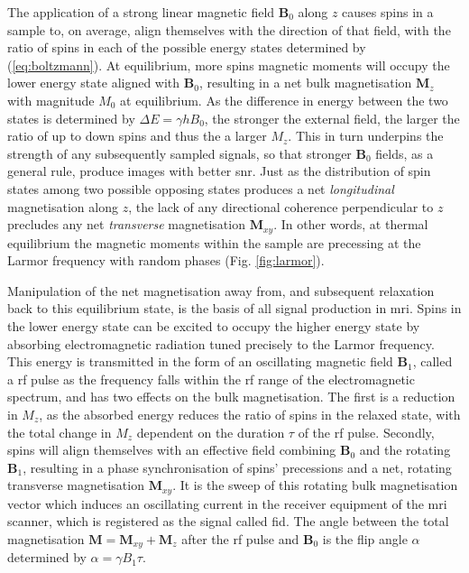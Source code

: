 %
%

The application of a strong linear magnetic field $\mathbf{B}_0$ along $z$ causes spins in a sample to, on average, align themselves with the direction of that field, with the ratio of spins in each of the possible energy states determined by (\ref{eq:boltzmann}).
At equilibrium, more spins magnetic moments will occupy the lower energy state aligned with $\mathbf{B}_0$, resulting in a net bulk magnetisation $\mathbf{M}_z$ with magnitude $M_0$ at equilibrium.
As the difference in energy between the two states is determined by $\Delta E = \gamma h B_0$, the stronger the external field, the larger the ratio of up to down spins and thus the a larger $M_z$.
This in turn underpins the strength of any subsequently sampled signals, so that stronger $\mathbf{B}_0$ fields, as a general rule, produce images with better \gls{snr}.
Just as the distribution of spin states among two possible opposing states produces a net \textit{longitudinal} magnetisation along $z$, the lack of any directional coherence perpendicular to $z$ precludes any net \textit{transverse} magnetisation $\mathbf{M}_{xy}$.
In other words, at thermal equilibrium the magnetic moments within the sample are precessing at the Larmor frequency with random phases (Fig. \ref{fig:larmor}).

Manipulation of the net magnetisation away from, and subsequent relaxation back to this equilibrium state, is the basis of all signal production in \gls{mri}.
Spins in the lower energy state can be excited to occupy the higher energy state by absorbing electromagnetic radiation tuned precisely to the Larmor frequency.
This energy is transmitted in the form of an oscillating magnetic field $\mathbf{B}_1$, called a \gls{rf} pulse as the frequency falls within the \gls{rf} range of the electromagnetic spectrum, and has two effects on the bulk magnetisation.
The first is a reduction in $M_z$, as the absorbed energy reduces the ratio of spins in the relaxed state, with the total change in $M_z$ dependent on the duration $\tau$ of the \gls{rf} pulse.
Secondly, spins will align themselves with an effective field combining $\mathbf{B}_0$ and the rotating $\mathbf{B}_1$, resulting in a phase synchronisation of spins' precessions and a net, rotating transverse magnetisation $\mathbf{M}_{xy}$.
It is the sweep of this rotating bulk magnetisation vector which induces an oscillating current in the receiver equipment of the \gls{mri} scanner, which is registered as the signal called \gls{fid}.
The angle between the total magnetisation $\mathbf{M} = \mathbf{M}_{xy} + \mathbf{M}_{z}$ after the \gls{rf} pulse and $\mathbf{B}_0$ is the flip angle $\alpha$ determined by $\alpha = \gamma B_1 \tau$.


